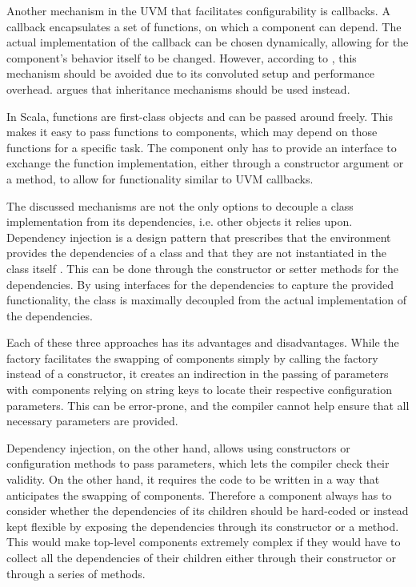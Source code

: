 Another mechanism in the UVM that facilitates configurability is callbacks. A callback encapsulates a set of
functions, on which a component can depend. The actual implementation of the callback can be chosen
dynamically, allowing for the component's behavior itself to be changed. However, according to
\citeauthor{sutherland2015uvm} \cite{sutherland2015uvm}, this mechanism should be avoided due to its convoluted
setup and performance overhead. \citeauthor{sutherland2015uvm} argues that inheritance mechanisms should be used instead.

In Scala, functions are first-class objects and can be passed around freely. This makes it easy to pass
functions to components, which may depend on those functions for a specific task. The component only has to provide an interface to
exchange the function implementation, either through a constructor argument or a method, to allow for functionality similar to UVM callbacks.

The discussed mechanisms are not the only options to decouple a class implementation from its dependencies, i.e. other
objects it relies upon. Dependency injection is a design pattern that prescribes that the environment provides the dependencies of a class and that they are not instantiated in the class itself \cite{ioc_di}. This can be done through the
constructor or setter methods for the dependencies. By using interfaces for the dependencies to capture the
provided functionality, the class is maximally decoupled from the actual implementation of the dependencies.

Each of these three approaches has its advantages and disadvantages. While the factory facilitates the swapping of
components simply by calling the factory instead of a constructor, it creates an indirection in the passing of
parameters with components relying on string keys to locate their respective configuration parameters.
This can be error-prone, and the compiler cannot help ensure that all necessary parameters are provided.

Dependency injection, on the other hand, allows using constructors or configuration methods to pass
parameters, which lets the compiler check their validity. On the other hand, it requires the code to be written in a
way that anticipates the swapping of components. Therefore a component always has to consider whether the dependencies of its
children should be hard-coded or instead kept flexible by exposing the dependencies through its constructor or a method. This would make top-level components extremely complex if they would have to collect all the dependencies of their
children either through their constructor or through a series of methods.

